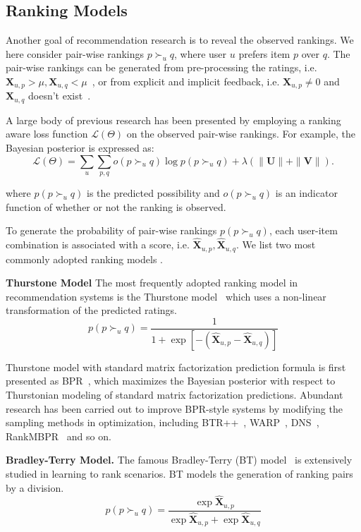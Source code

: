 \documentclass[letterpaper]{article} %
\newcommand{\Rating}{\mathbf{X}}
\newcommand{\Loss}{\mathcal{L}}
\begin{document}
\subsection{Ranking Models}
Another goal of recommendation research is to reveal the observed rankings. We here consider pair-wise rankings $p\succ_u q$, where user $u$ prefers item $p$ over $q$. The pair-wise rankings can be generated from pre-processing  the ratings, i.e. $\Rating_{u,p}> \mu, \Rating_{u,q}<\mu$~\cite{Hu2017Decoupled}, or from explicit and implicit feedback, i.e. $\Rating_{u,p}\neq 0$ and $ \Rating_{u,q}$ doesn't exist~\cite{Rendle2009BPR}. 

A large body of previous research has been presented by employing a ranking aware loss function  $\Loss(\Theta)$ on the observed pair-wise rankings. For example, the Bayesian posterior is expressed as:
\begin{equation}
\Loss(\Theta) = \sum_{u}\sum_{p,q} o(p\succ_u q) \log p(p\succ_u q) + \lambda(\|\mathbf{U}\| + \|\mathbf{V}\|).
\end{equation}

where $p(p\succ_u q)$ is the predicted possibility and $o(p\succ_u q)$ is an indicator function of whether or not the ranking is observed. 

To generate the probability of pair-wise rankings $p(p\succ_u q)$,  each user-item combination is associated with a score, i.e. $\hat{\Rating}_{u,p},\hat{\Rating}_{u,q}$.  We list two most commonly adopted ranking models . 


\textbf{Thurstone Model} The most frequently adopted ranking model in recommendation systems is the Thurstone model~\cite{Thurstone1927law} which uses a non-linear transformation of the predicted ratings. 
\begin{equation}
p(p\succ_u q) = \frac{1} {1+\exp[-(\hat{\Rating}_{u,p}-\hat{\Rating}_{u,q})]}
\end{equation}

Thurstone model with standard matrix factorization prediction formula is first presented as BPR~\cite{Rendle2009BPR}, which maximizes the Bayesian posterior with respect to Thurstonian modeling of standard matrix factorization predictions. Abundant research has been carried out to improve BPR-style systems by modifying the sampling methods in optimization, including BTR++~\cite{Lerche2014Using}, WARP~\cite{Weston2011Wsabie}, DNS~\cite{Zhang2013Optimizing}, RankMBPR~\cite{Yu2016RankMBPR} and so on.

\textbf{Bradley-Terry Model.} The famous Bradley-Terry (BT) model~\cite{Hunter2004MM} is extensively studied in learning to rank scenarios. BT models the generation of ranking pairs by a division.
\begin{equation}\label{equ:BT}
p(p\succ_u q) = \frac{\exp{\hat{\Rating}_{u,p}}}{\exp{\hat{\Rating}_{u,p}}+ \exp{\hat{\Rating}_{u,q}}} 
\end{equation}
\end{document}
